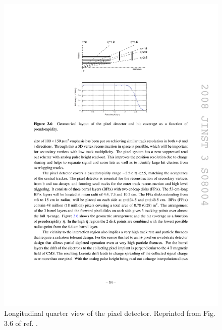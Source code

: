 \documentclass[dissertation.tex]{subfiles}
\begin{document}
\begin{figure}
	\centering
	\includegraphics[scale=1.0]{pixel_longitudinal_quarter_view}
	\caption{Longitudinal quarter view of the pixel detector.  Reprinted from Fig. 3.6 of ref. \cite{1748-0221-3-08-S08004}.}
	\label{fig:pixel_longitudinal_quarter_view}
\end{figure}
\end{document}
